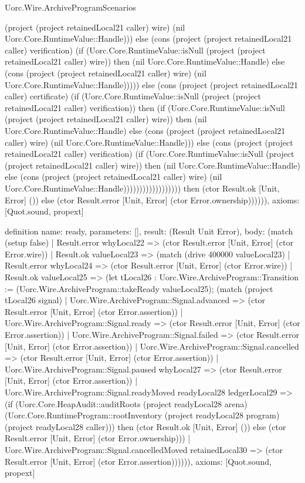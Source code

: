 \begin{lexlean}{Uorc.Wire.ArchiveProgramScenarios}
\begin{semanticmodule}
{(project (project retainedLocal21 caller) wire) (nil Uorc.Core.RuntimeValue::Handle))) else (cons (project (project retainedLocal21 caller) verification) (if (Uorc.Core.RuntimeValue::isNull (project (project retainedLocal21 caller) wire)) then (nil Uorc.Core.RuntimeValue::Handle) else (cons (project (project retainedLocal21 caller) wire) (nil Uorc.Core.RuntimeValue::Handle))))) else (cons (project (project retainedLocal21 caller) certificate) (if (Uorc.Core.RuntimeValue::isNull (project (project retainedLocal21 caller) verification)) then (if (Uorc.Core.RuntimeValue::isNull (project (project retainedLocal21 caller) wire)) then (nil Uorc.Core.RuntimeValue::Handle) else (cons (project (project retainedLocal21 caller) wire) (nil Uorc.Core.RuntimeValue::Handle))) else (cons (project (project retainedLocal21 caller) verification) (if (Uorc.Core.RuntimeValue::isNull (project (project retainedLocal21 caller) wire)) then (nil Uorc.Core.RuntimeValue::Handle) else (cons (project (project retainedLocal21 caller) wire) (nil Uorc.Core.RuntimeValue::Handle)))))))))))))))))) then (ctor Result.ok [Unit, Error] ()) else (ctor Result.error [Unit, Error] (ctor Error.ownership)))))),
  axioms: [Quot.sound, propext]
}

definition{
  name: ready,
  parameters: [],
  result: (Result Unit Error),
  body: (match (setup false)
    | Result.error whyLocal22 => (ctor Result.error [Unit, Error] (ctor Error.wire))
    | Result.ok valueLocal23 => (match (drive 400000 valueLocal23)
      | Result.error whyLocal24 => (ctor Result.error [Unit, Error] (ctor Error.wire))
      | Result.ok valueLocal25 => (let tLocal26 : Uorc.Wire.ArchiveProgram::Transition := (Uorc.Wire.ArchiveProgram::takeReady valueLocal25); (match (project tLocal26 signal)
        | Uorc.Wire.ArchiveProgram::Signal.advanced => (ctor Result.error [Unit, Error] (ctor Error.assertion))
        | Uorc.Wire.ArchiveProgram::Signal.ready => (ctor Result.error [Unit, Error] (ctor Error.assertion))
        | Uorc.Wire.ArchiveProgram::Signal.failed => (ctor Result.error [Unit, Error] (ctor Error.assertion))
        | Uorc.Wire.ArchiveProgram::Signal.cancelled => (ctor Result.error [Unit, Error] (ctor Error.assertion))
        | Uorc.Wire.ArchiveProgram::Signal.paused whyLocal27 => (ctor Result.error [Unit, Error] (ctor Error.assertion))
        | Uorc.Wire.ArchiveProgram::Signal.readyMoved readyLocal28 ledgerLocal29 => (if (Uorc.Core.HeapAudit::auditRoots (project readyLocal28 arena) (Uorc.Core.RuntimeProgram::rootInventory (project readyLocal28 program) (project readyLocal28 caller))) then (ctor Result.ok [Unit, Error] ()) else (ctor Result.error [Unit, Error] (ctor Error.ownership)))
        | Uorc.Wire.ArchiveProgram::Signal.cancelledMoved retainedLocal30 => (ctor Result.error [Unit, Error] (ctor Error.assertion)))))),
  axioms: [Quot.sound, propext]
}


\end{semanticmodule}
\end{lexlean}
